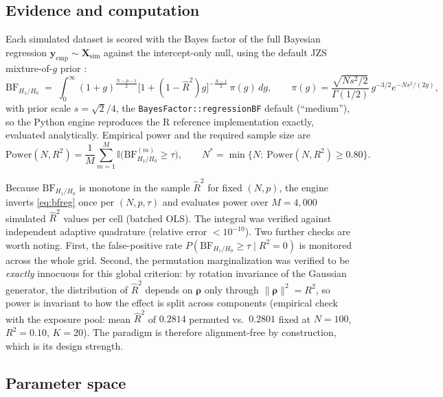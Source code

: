 \documentclass[11pt,a4paper]{article}
\newcommand{\BF}{\mathrm{BF}}
\begin{document}
\subsection{Evidence and computation}

Each simulated dataset is scored with the Bayes factor of the full Bayesian regression $\mathbf{y}_{\mathrm{emp}}\sim\mathbf{X}_{\mathrm{sim}}$ against the intercept-only null, using the default JZS mixture-of-$g$ prior \cite{liang2008,rouder2012}:
\begin{equation}
\BF_{H_1/H_0}\;=\;\int_0^{\infty}(1+g)^{\frac{N-p-1}{2}}\bigl[1+(1-\hat R^{2})g\bigr]^{-\frac{N-1}{2}}\,\pi(g)\,dg,
\qquad
\pi(g)=\frac{\sqrt{Ns^{2}/2}}{\Gamma(1/2)}\,g^{-3/2}e^{-Ns^{2}/(2g)},
\label{eq:bfreg}
\end{equation}
with prior scale $s=\sqrt{2}/4$, the \texttt{BayesFactor::regressionBF} default (``medium''), so the Python engine reproduces the R reference implementation exactly, evaluated analytically. Empirical power and the required sample size are
\begin{equation}
\mathrm{Power}(N,R^{2})=\frac{1}{M}\sum_{m=1}^{M}\mathbb{I}\bigl(\BF_{H_1/H_0}^{(m)}\ge\tau\bigr),
\qquad
N^{*}=\min\{N:\ \mathrm{Power}(N,R^{2})\ge0.80\}.
\end{equation}

Because $\BF_{H_1/H_0}$ is monotone in the sample $\hat R^{2}$ for fixed $(N,p)$, the engine inverts \eqref{eq:bfreg} once per $(N,p,\tau)$ and evaluates power over $M=4{,}000$ simulated $\hat R^{2}$ values per cell (batched OLS). The integral was verified against independent adaptive quadrature (relative error $<10^{-10}$). Two further checks are worth noting. First, the false-positive rate $P(\BF_{H_1/H_0}\ge\tau\mid R^{2}=0)$ is monitored across the whole grid. Second, the permutation marginalization was verified to be \emph{exactly} innocuous for this global criterion: by rotation invariance of the Gaussian generator, the distribution of $\hat R^{2}$ depends on $\bm\rho$ only through $\lVert\bm\rho\rVert^{2}=R^{2}$, so power is invariant to how the effect is split across components (empirical check with the exposure pool: mean $\hat R^{2}$ of $0.2814$ permuted vs.\ $0.2801$ fixed at $N=100$, $R^{2}=0.10$, $K=20$). The paradigm is therefore alignment-free by construction, which is its design strength.

\subsection{Parameter space}
\end{document}
